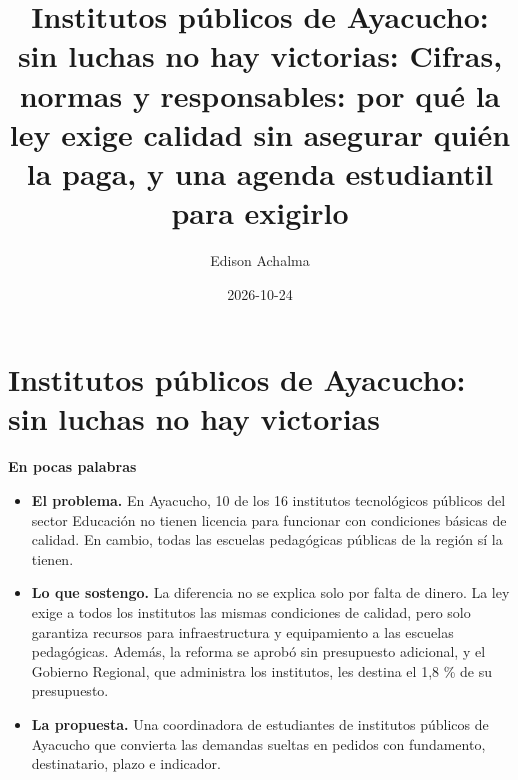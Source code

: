 \documentclass[
  jou,
  floatsintext,
  longtable,
  a4paper,
  nolmodern,
  notxfonts,
  notimes,
  12pt,
  colorlinks=true,linkcolor=blue,citecolor=blue,urlcolor=blue]{apa7}
\title{Institutos públicos de Ayacucho: sin luchas no hay victorias:
Cifras, normas y responsables: por qué la ley exige calidad sin asegurar
quién la paga, y una agenda estudiantil para exigirlo}
\author{Edison Achalma}
\affiliation{
{Escuela Profesional de Economía, Universidad Nacional de San Cristóbal
de Huamanga}}
\date{2026-10-24}
\providecommand{\tightlist}{%
  \setlength{\itemsep}{0pt}\setlength{\parskip}{0pt}}
\begin{document}
\maketitle


\hypertarget{toc}{}
\tableofcontents
\newpage
\section[Introduction]{Institutos públicos de Ayacucho: sin luchas no
hay victorias}


\setlength\LTleft{0pt}




\begin{tcolorbox}[enhanced jigsaw, arc=.35mm, bottomrule=.15mm, breakable, colback=white, colframe=quarto-callout-note-color-frame, left=2mm, leftrule=.75mm, opacityback=0, rightrule=.15mm, toprule=.15mm]
\begin{minipage}[t]{5.5mm}
\textcolor{quarto-callout-note-color}{\faInfo}
\end{minipage}%
\begin{minipage}[t]{\textwidth - 5.5mm}

\vspace{-3mm}\textbf{En pocas palabras}\vspace{3mm}

\begin{itemize}
\tightlist
\item
  \textbf{El problema.} En Ayacucho, 10 de los 16 institutos
  tecnológicos públicos del sector Educación no tienen licencia para
  funcionar con condiciones básicas de calidad. En cambio, todas las
  escuelas pedagógicas públicas de la región sí la tienen.
\item
  \textbf{Lo que sostengo.} La diferencia no se explica solo por falta
  de dinero. La ley exige a todos los institutos las mismas condiciones
  de calidad, pero solo garantiza recursos para infraestructura y
  equipamiento a las escuelas pedagógicas. Además, la reforma se aprobó
  sin presupuesto adicional, y el Gobierno Regional, que administra los
  institutos, les destina el 1,8 \% de su presupuesto.
\item
  \textbf{La propuesta.} Una coordinadora de estudiantes de institutos
  públicos de Ayacucho que convierta las demandas sueltas en pedidos con
  fundamento, destinatario, plazo e indicador.
\end{itemize}

\end{minipage}%
\end{tcolorbox}
\end{document}
